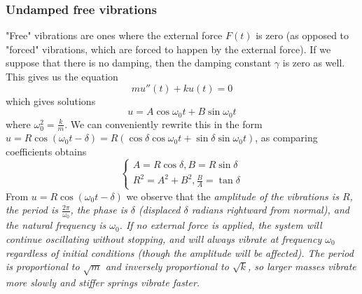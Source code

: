 \documentclass{article}
\begin{document}
\subsubsection{Undamped free vibrations} \normalfont "Free" vibrations are ones where the external force $F(t)$ is zero (as opposed to "forced" vibrations, which are forced to happen by the external force). If we suppose that there is no damping, then the damping constant $\gamma$ is zero as well. This gives us the equation
\begin{equation*}
    mu''(t)+ku(t) = 0
\end{equation*}
which gives solutions
\begin{equation*}
    u = A\cos \omega_0 t + B\sin \omega_0 t
\end{equation*}
where $\omega_0^2 = \frac{k}{m}$. We can conveniently rewrite this in the form $u = R\cos(\omega_0 t - \delta) = R(\cos\delta \cos \omega_0 t + \sin \delta \sin \omega_0 t)$, as comparing coefficients obtains
\begin{equation*}
    \begin{cases}
        A = R\cos \delta, B = R\sin\delta \\
        R^2 = A^2 + B^2, \frac{B}{A} = \tan \delta
    \end{cases}
\end{equation*}
From $u = R\cos(\omega_0 t - \delta)$ we observe that the \it amplitude \normalfont of the vibrations is $R$, the \it period \normalfont is $\frac{2\pi}{\omega_0}$, the \it phase \normalfont is $\delta$ (displaced $\delta$ radians rightward from normal), and the \it natural frequency \normalfont is $\omega_0$. If no external force is applied, the system will continue oscillating without stopping, and will always vibrate at frequency $\omega_0$ regardless of initial conditions (though the amplitude will be affected). The period is proportional to $\sqrt{m}$ and inversely proportional to $\sqrt{k}$, so larger masses vibrate more slowly and stiffer springs vibrate faster. \\ \\
\end{document}
